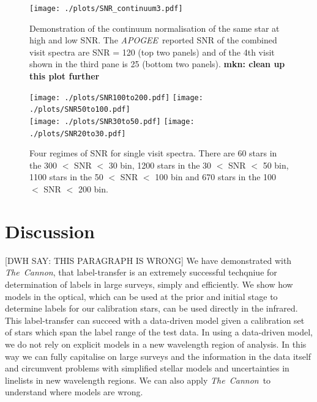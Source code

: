 \documentclass[12pt, preprint]{aastex}
\newcommand{\teff}{\mbox{$\rm T_{eff}$}}
\newcommand{\logg}{\mbox{$\rm \log g$}}
\newcommand{\tc}{\textsl{The~Cannon}}
\newcommand{\apogee}{\textsl{APOGEE}}
\begin{document}
 \begin{figure}[!h]
  \texttt{[image: ./plots/SNR\_continuum3.pdf]}
  \caption{Demonstration of the continuum normalisation of the same star at high and low SNR. The \apogee\ reported SNR of the combined visit spectra are SNR = 120 (top two panels) and of the 4th visit shown in the third pane is 25 (bottom two panels). \textbf{mkn: clean up this plot further} }
\label{fig:lowsnr}
\end{figure}

 \begin{figure}[!h]
 \centering
 \texttt{[image: ./plots/SNR100to200.pdf]}
\texttt{[image: ./plots/SNR50to100.pdf]}\\
\texttt{[image: ./plots/SNR30to50.pdf]}
\texttt{[image: ./plots/SNR20to30.pdf]}
    \caption{Four regimes of SNR for single visit spectra. There are 60 stars in the 300 $<$  SNR $<$ 30 bin, 1200 stars in the 30 $<$ SNR $<$ 50 bin, 1100 stars in the 50 $<$ SNR $<$ 100 bin and 670 stars in the 100 $<$  SNR $<$ 200 bin.}
\label{fig:SNR}
\end{figure}

\section{Discussion}

[DWH SAY: THIS PARAGRAPH IS WRONG] We have demonstrated with \tc,  that label-transfer is an extremely successful techqniue for determination of labels in large surveys, simply and efficiently. We show how models in the optical, which can be used at the prior and initial stage to determine labels for our calibration stars, can be used directly in the infrared. This label-transfer can succeed with a data-driven model given a calibration set of stars which span the label range of the test data. In using a data-driven model, we do not rely on explicit models in a new wavelength region of analysis. In this way we can fully capitalise on large surveys and the information in the data itself and circumvent problems with simplified stellar models and uncertainties in linelists in new wavelength regions. We can also apply \tc\ to understand where models are wrong.  

\end{document}
